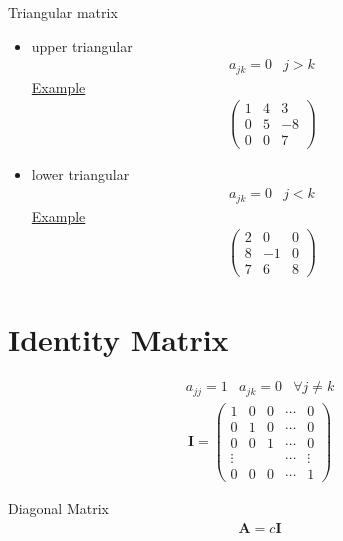 \begin{myDefinition}
	Triangular matrix
	\begin{itemize}
		\item upper triangular
		\begin{eqnarray}
			a_{jk}=0&j>k
		\end{eqnarray}
		\underline{Example}
		\begin{eqnarray*}
			\begin{pmatrix}
				1 & 4 & 3\\
				0 & 5 & -8\\
				0 & 0 & 7
			\end{pmatrix}
		\end{eqnarray*}
		\item lower triangular
		\begin{eqnarray}
			a_{jk}=0&j<k
		\end{eqnarray}
		\underline{Example}
		\begin{eqnarray*}
			\begin{pmatrix}
				2 & 0 & 0\\
				8&-1&0\\
				7&6&8
			\end{pmatrix}
		\end{eqnarray*}
	\end{itemize}
\end{myDefinition}

\section{Identity Matrix}
\begin{myDefinition}
	\begin{eqnarray}
		a_{jj}=1&a_{jk}=0&\forall j\neq k
	\end{eqnarray}
	\begin{eqnarray}
		\mathbf{I}=
		\begin{pmatrix}
			1 & 0 & 0 & \cdots & 0\\
			0 & 1 & 0 & \cdots & 0\\
			0 & 0 & 1 & \cdots & 0\\
			\vdots &  &  & \cdots & \vdots\\
			0 & 0 & 0 &\cdots & 1
			
		\end{pmatrix}
	\end{eqnarray}
\end{myDefinition}
\begin{myDefinition}
	Diagonal Matrix
	\begin{eqnarray}
		\mathbf{A}=c\mathbf{I}
	\end{eqnarray}
\end{myDefinition}


